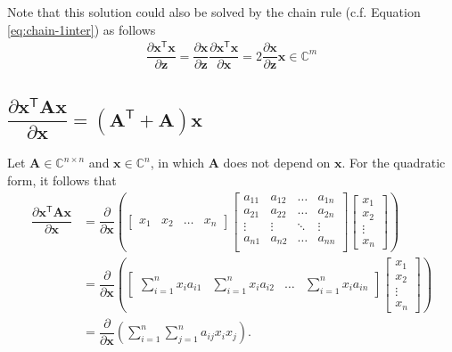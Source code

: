 \documentclass{article}
\newcommand{\trans}{\mathsf{T}}
\begin{document}
Note that this solution could also be solved by the chain rule (c.f. Equation \eqref{eq:chain-1inter}) as follows
\begin{align}
    \boxed{\dfrac{\partial \mathbf{x}^\trans \mathbf{x}}{\partial \mathbf{z}} = \dfrac{\partial \mathbf{x}}{\partial \mathbf{z}} \dfrac{\partial \mathbf{x}^\trans \mathbf{x}}{\partial \mathbf{x}} = 2\dfrac{\partial \mathbf{x}}{\partial \mathbf{z}}\mathbf{x} \in \mathbb{C}^m}
\end{align}

\subsection{\(\dfrac{\partial \mathbf{x}^\trans \mathbf{A} \mathbf{x}}{\partial \mathbf{x}} = \left(\mathbf{A}^\trans + \mathbf{A}\right) \mathbf{x}\)}
Let \(\mathbf{A}\in \mathbb{C}^{n\times n}\) and \(\mathbf{x} \in \mathbb{C}^{n}\), in which \(\mathbf{A}\) does not depend on \(\mathbf{x}\). For the quadratic form, it follows that
\begin{align}
    \dfrac{\partial \mathbf{x}^\trans \mathbf{A} \mathbf{x}}{\partial \mathbf{x}} &= \dfrac{\partial}{\partial \mathbf{x}} \left(
    \begin{bmatrix}
        x_{1} & x_{2} & \dots & x_{n}
    \end{bmatrix}
    \begin{bmatrix}
        a_{11} & a_{12} & \dots & a_{1n} \\
        a_{21} & a_{22} & \dots & a_{2n} \\
        \vdots & \vdots & \ddots & \vdots \\
        a_{n1} & a_{n2} & \dots & a_{nn} \\
    \end{bmatrix} \begin{bmatrix}
        x_{1} \\ x_{2} \\ \vdots \\ x_{n}
    \end{bmatrix} \right) \\
    &= \dfrac{\partial}{\partial \mathbf{x}} \left(
			\begin{bmatrix}
				\displaystyle \sum_{i = 1}^{n} x_{i}a_{i1} & 
				\displaystyle \sum_{i = 1}^{n} x_{i}a_{i2} & 
				\dots & 
				\displaystyle \sum_{i = 1}^{n} x_{i}a_{in}
			\end{bmatrix} \begin{bmatrix}
				x_{1} \\ x_{2} \\ \vdots \\ x_{n}
			\end{bmatrix} \right) \\
            &= \dfrac{\partial}{\partial \mathbf{x}} \left(
				\sum_{i = 1}^{n}\sum_{j = 1}^{n} a_{ij} x_{i} x_{j}
			\right).
\end{align}
\end{document}
